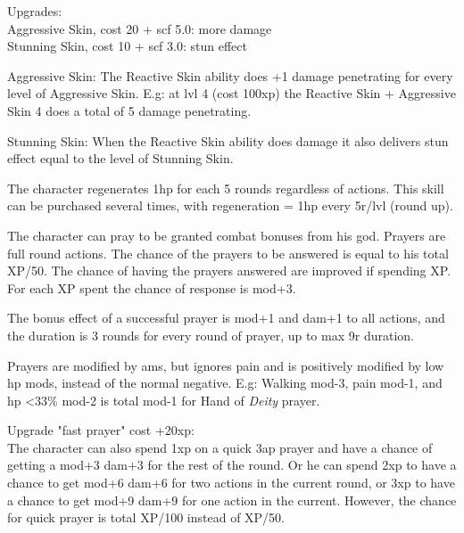Upgrades: \\
Aggressive Skin, cost 20 + scf 5.0: more damage\\
Stunning Skin, cost 10 + scf 3.0: stun effect

Aggressive Skin: The Reactive Skin ability does +1 damage penetrating for every level of Aggressive Skin. E.g: at lvl 4 (cost 100xp) the Reactive Skin + Aggressive Skin 4 does a total of 5 damage penetrating.

Stunning Skin: When the Reactive Skin ability does damage it also delivers stun effect equal to the level of Stunning Skin.


 The character regenerates 1hp for each 5 rounds regardless of actions. This skill can be purchased several times, with regeneration = 1hp every 5r/lvl (round up).


 The character can pray to be granted combat bonuses from his god. Prayers are full round actions. The chance of the prayers to be answered is equal to his total XP/50. The chance of having the prayers answered are improved if spending XP. For each XP spent the chance of response is mod+3.

The bonus effect of a successful prayer is mod+1 and dam+1 to all actions, and the duration is 3 rounds for every round of prayer, up to max 9r duration.

Prayers are modified by ams, but ignores pain and is positively modified by low hp mods, instead of the normal negative. E.g: Walking mod-3, pain mod-1, and hp <33\% mod-2 is total mod-1 for Hand of \emph{Deity} prayer.

Upgrade "fast prayer" cost +20xp:\\
The character can also spend 1xp on a quick 3ap prayer and have a chance of getting a mod+3 dam+3 for the rest of the round. Or he can spend 2xp to have a chance to get mod+6 dam+6 for two actions in the current round, or 3xp to have a chance to get mod+9 dam+9 for one action in the current. However, the chance for quick prayer is total XP/100 instead of XP/50.


